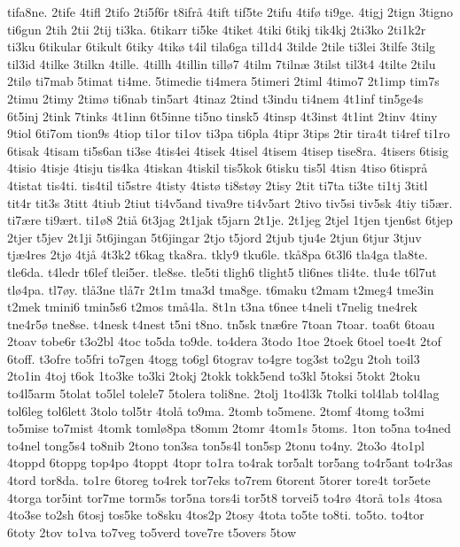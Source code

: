 {tifa8ne.
2tife
4tifl
2tifo
2ti5f6r
t8ifr^^e5
4tift
tif5te
2tifu
4tif^^f8
ti9ge.
4tigj
2tign
3tigno
ti6gun
2tih
2tii
2tij
ti3ka.
6tikarr
ti5ke
4tiket
4tiki
6tikj
tik4kj
2ti3ko
2ti1k2r
ti3ku
6tikular
6tikult
6tiky
4tik^^f8
t4il
tila6ga
til1d4
3tilde
2tile
ti3lei
3tilfe
3tilg
til3id
4tilke
3tilkn
4tille.
4tillh
4tillin
till^^f87
4tilm
7tiln^^e6
3tilst
til3t4
4tilte
2tilu
2til^^f8
ti7mab
5timat
ti4me.
5timedie
ti4mera
5timeri
2timl
4timo7
2t1imp
tim7s
2timu
2timy
2tim^^f8
ti6nab
tin5art
4tinaz
2tind
t3indu
ti4nem
4t1inf
tin5ge4s
6t5inj
2tink
7tinks
4t1inn
6t5inne
ti5no
tinsk5
4tinsp
4t3inst
4t1int
2tinv
4tiny
9tiol
6ti7om
tion9s
4tiop
ti1or
ti1ov
ti3pa
ti6pla
4tipr
3tips
2tir
tira4t
ti4ref
ti1ro
6tisak
4tisam
ti5s6an
ti3se
4tis4ei
4tisek
4tisel
4tisem
4tisep
tise8ra.
4tisers
6tisig
4tisio
4tisje
4tisju
tis4ka
4tiskan
4tiskil
tis5kok
6tisku
tis5l
4tisn
4tiso
6tispr^^e5
4tistat
tis4ti.
tis4til
ti5stre
4tisty
4tist^^f8
ti8st^^f8y
2tisy
2tit
ti7ta
ti3te
ti1tj
3titl
tit4r
tit3s
3titt
4tiub
2tiut
ti4v5and
tiva9re
ti4v5art
2tivo
tiv5si
tiv5sk
4tiy
ti5^^e6r.
ti7^^e6re
ti9^^e6rt.
ti1^^f88
2ti^^e5
6t3jag
2t1jak
t5jarn
2t1je.
2t1jeg
2tjel
1tjen
tjen6st
6tjep
2tjer
t5jev
2t1ji
5t6jingan
5t6jingar
2tjo
t5jord
2tjub
tju4e
2tjun
6tjur
3tjuv
tj^^e64res
2tj^^f8
4tj^^e5
4t3k2
t6kag
tka8ra.
tkly9
tku6le.
tk^^e58pa
6t3l6
tla4ga
tla8te.
tle6da.
t4ledr
t6lef
tlei5er.
tle8se.
tle5ti
tligh6
tlight5
tli6nes
tli4te.
tlu4e
t6l7ut
tl^^f84pa.
tl7^^f8y.
tl^^e53ne
tl^^e57r
2t1m
tma3d
tma8ge.
t6maku
t2mam
t2meg4
tme3in
t2mek
tmini6
tmin5s6
t2mos
tm^^e54la.
8t1n
t3na
t6nee
t4neli
t7nelig
tne4rek
tne4r5^^f8
tne8se.
t4nesk
t4nest
t5ni
t8no.
tn5sk
tn^^e66re
7toan
7toar.
toa6t
6toau
2toav
tobe6r
t3o2bl
4toc
to5da
to9de.
to4dera
3todo
1toe
2toek
6toel
toe4t
2tof
6toff.
t3ofre
to5fri
to7gen
4togg
to6gl
6tograv
to4gre
tog3st
to2gu
2toh
toil3
2to1in
4toj
t6ok
1to3ke
to3ki
2tokj
2tokk
tokk5end
to3kl
5toksi
5tokt
2toku
to4l5arm
5tolat
to5lel
tolele7
5tolera
toli8ne.
2tolj
1to4l3k
7tolki
tol4lab
tol4lag
tol6leg
tol6lett
3tolo
tol5tr
4tol^^e5
to9ma.
2tomb
to5mene.
2tomf
4tomg
to3mi
to5mise
to7mist
4tomk
toml^^f88pa
t8omm
2tomr
4tom1s
5toms.
1ton
to5na
to4ned
to4nel
tong5s4
to8nib
2tono
ton3sa
ton5s4l
ton5sp
2tonu
to4ny.
2to3o
4to1pl
4toppd
6toppg
top4po
4toppt
4topr
to1ra
to4rak
tor5alt
tor5ang
to4r5ant
to4r3as
4tord
tor8da.
to1re
6toreg
to4rek
tor7eks
to7rem
6torent
5torer
tore4t
tor5ete
4torga
tor5int
tor7me
torm5s
tor5na
tors4i
tor5t8
torvei5
to4r^^f8
4tor^^e5
to1s
4tosa
4to3se
to2sh
6tosj
tos5ke
to8sku
4tos2p
2tosy
4tota
to5te
to8ti.
to5to.
to4tor
6toty
2tov
to1va
to7veg
to5verd
tove7re
t5overs
5tow
}

